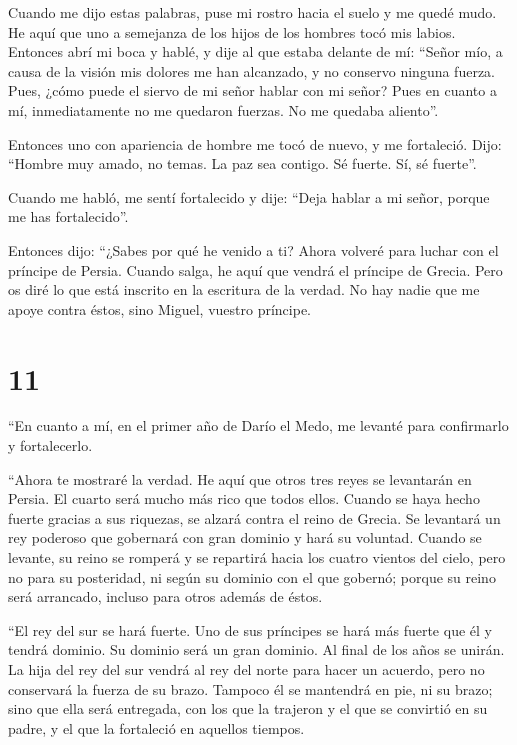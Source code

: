 Cuando me dijo estas palabras, puse mi rostro hacia el
suelo y me quedé mudo.  He aquí que uno a semejanza de
los hijos de los hombres tocó mis labios. Entonces abrí mi boca y hablé,
y dije al que estaba delante de mí: ``Señor mío, a causa de la visión
mis dolores me han alcanzado, y no conservo ninguna fuerza.
 Pues, ¿cómo puede el siervo de mi señor hablar con mi
señor? Pues en cuanto a mí, inmediatamente no me quedaron fuerzas. No me
quedaba aliento''.

 Entonces uno con apariencia de hombre me tocó de nuevo,
y me fortaleció.  Dijo: ``Hombre muy amado, no temas. La
paz sea contigo. Sé fuerte. Sí, sé fuerte''.

Cuando me habló, me sentí fortalecido y dije: ``Deja hablar a mi señor,
porque me has fortalecido''.

 Entonces dijo: ``¿Sabes por qué he venido a ti? Ahora
volveré para luchar con el príncipe de Persia. Cuando salga, he aquí que
vendrá el príncipe de Grecia.  Pero os diré lo que está
inscrito en la escritura de la verdad. No hay nadie que me apoye contra
éstos, sino Miguel, vuestro príncipe.

\hypertarget{section-10}{%
\section{11}\label{section-10}}

 ``En cuanto a mí, en el primer año de Darío el Medo, me
levanté para confirmarlo y fortalecerlo.

 ``Ahora te mostraré la verdad. He aquí que otros tres
reyes se levantarán en Persia. El cuarto será mucho más rico que todos
ellos. Cuando se haya hecho fuerte gracias a sus riquezas, se alzará
contra el reino de Grecia.  Se levantará un rey poderoso
que gobernará con gran dominio y hará su voluntad.  Cuando
se levante, su reino se romperá y se repartirá hacia los cuatro vientos
del cielo, pero no para su posteridad, ni según su dominio con el que
gobernó; porque su reino será arrancado, incluso para otros además de
éstos.

 ``El rey del sur se hará fuerte. Uno de sus príncipes se
hará más fuerte que él y tendrá dominio. Su dominio será un gran
dominio.  Al final de los años se unirán. La hija del rey
del sur vendrá al rey del norte para hacer un acuerdo, pero no
conservará la fuerza de su brazo. Tampoco él se mantendrá en pie, ni su
brazo; sino que ella será entregada, con los que la trajeron y el que se
convirtió en su padre, y el que la fortaleció en aquellos tiempos.

